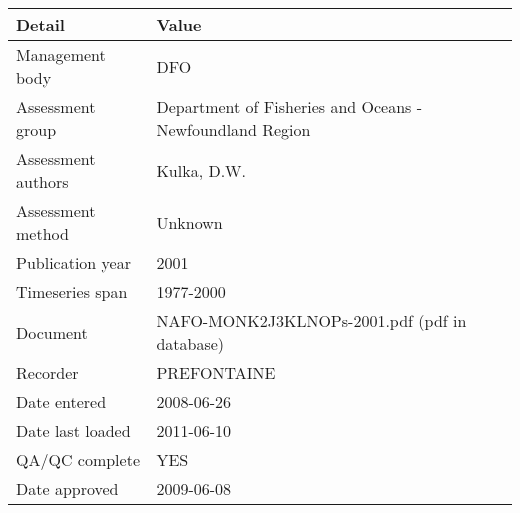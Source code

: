\begin{table}[htb]
\centering
\begin{tabular}{lp{7cm}}
\toprule
Detail & Value \\
\midrule
Management body    & DFO                                                      \\
Assessment group   & Department of Fisheries and Oceans - Newfoundland Region \\
Assessment authors & Kulka, D.W.                                              \\
Assessment method  & Unknown                                                  \\
Publication year   & 2001                                                     \\
Timeseries span    & 1977-2000                                                \\
Document           & NAFO-MONK2J3KLNOPs-2001.pdf (pdf in database)            \\
Recorder           & PREFONTAINE                                              \\
Date entered       & 2008-06-26                                               \\
Date last loaded   & 2011-06-10                                               \\
QA/QC complete     & YES                                                      \\
Date approved      & 2009-06-08                                               \\
\bottomrule
\end{tabular}
\label{tab:assessdet}
\end{table}
